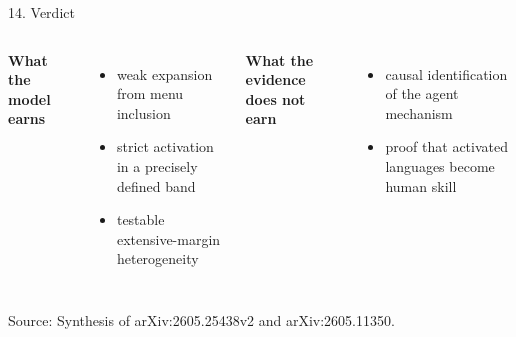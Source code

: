 \documentclass[aspectratio=169,10pt]{beamer}
\newcommand{\source}[1]{\vfill{\color{muted}\tiny Source: #1\par}}
\begin{document}
\begin{frame}{14. Verdict}
  \begin{columns}[T,onlytextwidth]
      {\Large\color{navy}\textbf{What the model earns}}
      \vspace{0.35cm}
      \begin{itemize}
        \item weak expansion from menu inclusion
        \item strict activation in a precisely defined band
        \item testable extensive-margin heterogeneity
      \end{itemize}
      \vspace{0.55cm}
      {\Large\color{navy}\textbf{What the evidence does not earn}}
      \vspace{0.35cm}
      \begin{itemize}
        \item causal identification of the agent mechanism
        \item proof that activated languages become human skill
      \end{itemize}
  \end{columns}
  \source{Synthesis of arXiv:2605.25438v2 and arXiv:2605.11350.}
\end{frame}
\end{document}
